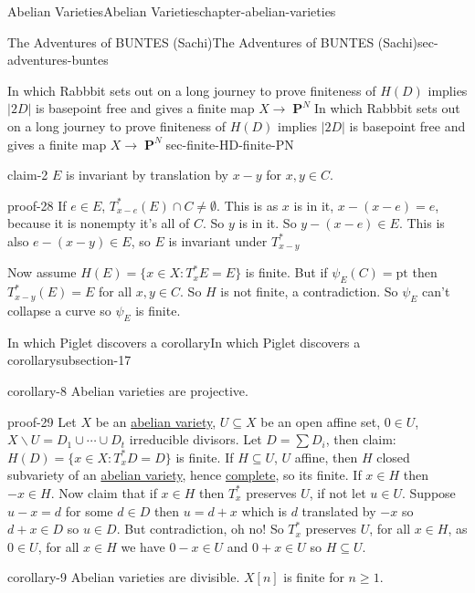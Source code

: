 \documentclass[oneside,10pt,]{book}
\numberwithin{equation}{section}
\DeclareMathOperator{\PP}{\mathbf{P}}
\begin{document}
\begin{chapterptx}{Abelian Varieties}{}{Abelian Varieties}{}{}{chapter-abelian-varieties}
\begin{sectionptx}{The Adventures of BUNTES (Sachi)}{}{The Adventures of BUNTES (Sachi)}{}{}{sec-adventures-buntes}
\begin{subsectionptx}{In which Rabbbit sets out on a long journey to prove finiteness of \(H(D)\) implies \(|2D|\) is basepoint free and gives a finite map \(X \to \PP^N\)}{}{In which Rabbbit sets out on a long journey to prove finiteness of \(H(D)\) implies \(|2D|\) is basepoint free and gives a finite map \(X \to \PP^N\)}{}{}{sec-finite-HD-finite-PN}
\begin{claim}{}{}{claim-2}%
\hypertarget{p-152}{}%
\(E\) is invariant by translation by \(x - y\) for \(x,y \in C\).%
\end{claim}
\begin{proofptx}{}{proof-28}
\hypertarget{p-153}{}%
If \(e \in E\), \(T_{x-e}^*(E) \cap C \ne \emptyset\). This is as \(x\) is in it, \(x-(x-e) =e\), because it is nonempty it's all of \(C\). So \(y\) is in it. So \(y- (x-e) \in E\). This is also \(e - (x-y) \in E\), so \(E\) is invariant under \(T^*_{x-y}\)%
\end{proofptx}
\hypertarget{p-154}{}%
Now assume \(H(E) = \{x\in X: T_x^*E  = E \}\) is finite. But if \(\psi_E(C) = \text{pt}\) then \(T_{x-y}^*(E)  = E\) for all \(x,y\in C\). So \(H\) is not finite, a contradiction. So \(\psi_E\) can't collapse a curve so \(\psi_E\) is finite.%
\end{subsectionptx}
%
%
\typeout{************************************************}
\typeout{************************************************}
%
\begin{subsectionptx}{In which Piglet discovers a corollary}{}{In which Piglet discovers a corollary}{}{}{subsection-17}
\begin{corollary}{}{}{corollary-8}%
\hypertarget{p-155}{}%
Abelian varieties are projective.%
\end{corollary}
\begin{proofptx}{}{proof-29}
\hypertarget{p-156}{}%
Let \(X\) be an \hyperref[def-buntes-abvar]{abelian variety}, \(U \subseteq X\) be an open affine set, \(0\in U\), \(X\smallsetminus U = D_1 \cup \cdots \cup D_t\) irreducible divisors. Let \(D = \sum D_i\), then claim: \(H(D) = \{x\in X: T_x^*D  = D \}\) is finite. If \(H\subseteq U\), \(U\) affine, then \(H\) closed subvariety of an \hyperref[def-buntes-abvar]{abelian variety}, hence \hyperref[def-abelian-complete-var]{complete}, so its finite. If \(x\in H\) then \(-x \in H\). Now claim that if \(x\in H\) then \(T_x^*\) preserves \(U\), if not let \(u\in U\). Suppose \(u-x = d\) for some \(d\in D\) then \(u = d+x\) which is \(d\) translated by \(-x\) so \(d+x \in D\) so \(u\in D\). But contradiction, oh no! So \(T_x^*\) preserves \(U\), for all \(x\in H\), as \(0 \in U\), for all \(x\in H\) we have \(0-x \in U\) and  \(0+x\in U\) so \(H\subseteq U\).%
\end{proofptx}
\begin{corollary}{}{}{corollary-9}%
\hypertarget{p-157}{}%
Abelian varieties are divisible. \(X[n]\) is finite for \(n\ge 1\).%

\end{corollary}
\end{subsectionptx}
\end{sectionptx}
\end{chapterptx}
\end{document}
